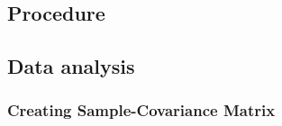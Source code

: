 \documentclass[
  man]{apa6}
\begin{document}
\hypertarget{procedure}{%
\subsection{Procedure}\label{procedure}}

\hypertarget{data-analysis}{%
\subsection{Data analysis}\label{data-analysis}}

\hypertarget{creating-sample-covariance-matrix}{%
\subsubsection{Creating Sample-Covariance Matrix}\label{creating-sample-covariance-matrix}}
\end{document}
